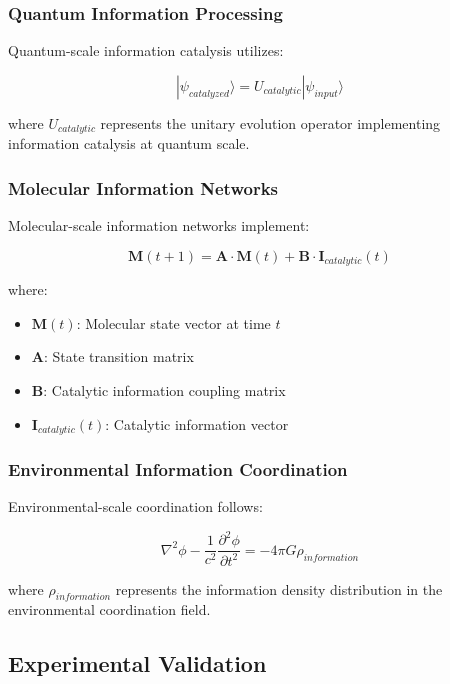 \subsubsection{Quantum Information Processing}

Quantum-scale information catalysis utilizes:

\begin{equation}
|\psi_{catalyzed}\rangle = U_{catalytic} |\psi_{input}\rangle
\end{equation}

where $U_{catalytic}$ represents the unitary evolution operator implementing information catalysis at quantum scale.

\subsubsection{Molecular Information Networks}

Molecular-scale information networks implement:

\begin{equation}
\mathbf{M}(t+1) = \mathbf{A} \cdot \mathbf{M}(t) + \mathbf{B} \cdot \mathbf{I}_{catalytic}(t)
\end{equation}

where:
\begin{itemize}
\item $\mathbf{M}(t)$: Molecular state vector at time $t$
\item $\mathbf{A}$: State transition matrix
\item $\mathbf{B}$: Catalytic information coupling matrix
\item $\mathbf{I}_{catalytic}(t)$: Catalytic information vector
\end{itemize}

\subsubsection{Environmental Information Coordination}

Environmental-scale coordination follows:

\begin{equation}
\nabla^2 \phi - \frac{1}{c^2} \frac{\partial^2 \phi}{\partial t^2} = -4\pi G \rho_{information}
\end{equation}

where $\rho_{information}$ represents the information density distribution in the environmental coordination field.

\subsection{Experimental Validation}

